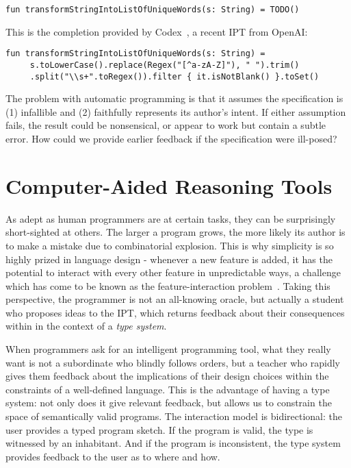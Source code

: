 \documentclass[10pt]{article}
\begin{document}
\begin{lstlisting}[basicstyle=\small\ttfamily]
  fun transformStringIntoListOfUniqueWords(s: String) = TODO()
\end{lstlisting}

\noindent This is the completion provided by Codex~\cite{chen2021evaluating}, a recent IPT from OpenAI:

\begin{lstlisting}[basicstyle=\small\ttfamily]
  fun transformStringIntoListOfUniqueWords(s: String) =
     s.toLowerCase().replace(Regex("[^a-zA-Z]"), " ").trim()
     .split("\\s+".toRegex()).filter { it.isNotBlank() }.toSet()
\end{lstlisting}

\noindent The problem with automatic programming is that it assumes the specification is (1) infallible and (2) faithfully represents its author's intent. If either assumption fails, the result could be nonsensical, or appear to work but contain a subtle error. How could we provide earlier feedback if the specification were ill-posed?

\section{Computer-Aided Reasoning Tools}\label{sec:computer-aided-reasoning-tools}

As adept as human programmers are at certain tasks, they can be surprisingly short-sighted at others. The larger a program grows, the more likely its author is to make a mistake due to combinatorial explosion. This is why simplicity is so highly prized in language design - whenever a new feature is added, it has the potential to interact with every other feature in unpredictable ways, a challenge which has come to be known as the feature-interaction problem~\cite{apel2013exploring}. Taking this perspective, the programmer is not an all-knowing oracle, but actually a student who proposes ideas to the IPT, which returns feedback about their consequences within in the context of a \textit{type system}.

When programmers ask for an intelligent programming tool, what they really want is not a subordinate who blindly follows orders, but a teacher who rapidly gives them feedback about the implications of their design choices within the constraints of a well-defined language. This is the advantage of having a type system: not only does it give relevant feedback, but allows us to constrain the space of semantically valid programs. The interaction model is bidirectional: the user provides a typed program sketch. If the program is valid, the type is witnessed by an inhabitant. And if the program is inconsistent, the type system provides feedback to the user as to where and how.
\end{document}
